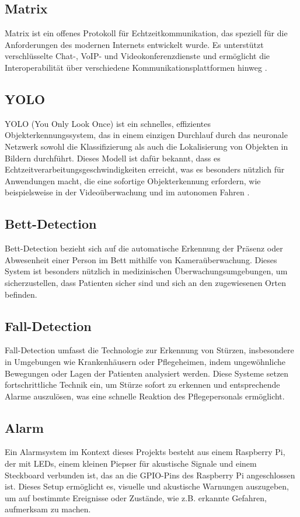 \subsection{Matrix}
\label{subsec:matrix}
Matrix ist ein offenes Protokoll für Echtzeitkommunikation, das speziell für die Anforderungen des modernen Internets entwickelt wurde. Es unterstützt verschlüsselte Chat-, VoIP- und Videokonferenzdienste und ermöglicht die Interoperabilität über verschiedene Kommunikationsplattformen hinweg \cite{Matrix}.

\subsection{YOLO}
\label{subsec:yolo}
YOLO (You Only Look Once) ist ein schnelles, effizientes Objekterkennungssystem, das in einem einzigen Durchlauf durch das neuronale Netzwerk sowohl die Klassifizierung als auch die Lokalisierung von Objekten in Bildern durchführt. Dieses Modell ist dafür bekannt, dass es Echtzeitverarbeitungsgeschwindigkeiten erreicht, was es besonders nützlich für Anwendungen macht, die eine sofortige Objekterkennung erfordern, wie beispielsweise in der Videoüberwachung und im autonomen Fahren \Cite{Yolo}. 

\subsection{Bett-Detection}
\label{subsec:beddetection}
Bett-Detection bezieht sich auf die automatische Erkennung der Präsenz oder Abwesenheit einer Person im Bett mithilfe von Kameraüberwachung. Dieses System ist besonders nützlich in medizinischen Überwachungsumgebungen, um sicherzustellen, dass Patienten sicher sind und sich an den zugewiesenen Orten befinden.

\subsection{Fall-Detection}
\label{subsec:falldetection}
Fall-Detection umfasst die Technologie zur Erkennung von Stürzen, insbesondere in Umgebungen wie Krankenhäusern oder Pflegeheimen, indem ungewöhnliche Bewegungen oder Lagen der Patienten analysiert werden. Diese Systeme setzen fortschrittliche Technik ein, um Stürze sofort zu erkennen und entsprechende Alarme auszulösen, was eine schnelle Reaktion des Pflegepersonals ermöglicht.

\subsection{Alarm}
\label{subsec:alarm}
Ein Alarmsystem im Kontext dieses Projekts besteht aus einem Raspberry Pi, der mit LEDs, einem kleinen Piepser für akustische Signale und einem Steckboard verbunden ist, das an die GPIO-Pins des Raspberry Pi angeschlossen ist. Dieses Setup ermöglicht es, visuelle und akustische Warnungen auszugeben, um auf bestimmte Ereignisse oder Zustände, wie z.B. erkannte Gefahren, aufmerksam zu machen.

